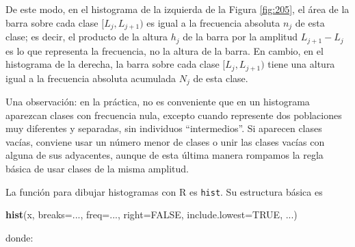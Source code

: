 \documentclass[
]{book}
\newenvironment{Shaded}{\begin{snugshade}}{\end{snugshade}}
\newcommand{\DataTypeTok}[1]{\textcolor[rgb]{0.13,0.29,0.53}{#1}}
\newcommand{\KeywordTok}[1]{\textcolor[rgb]{0.13,0.29,0.53}{\textbf{#1}}}
\newcommand{\NormalTok}[1]{#1}
\newcommand{\OtherTok}[1]{\textcolor[rgb]{0.56,0.35,0.01}{#1}}
\theoremstyle{definition}
\theoremstyle{definition}
\theoremstyle{definition}
\theoremstyle{remark}
\begin{document}
De este modo, en el histograma de la izquierda de la Figura \ref{fig:205}, el área de la barra sobre cada clase \([L_j,L_{j+1})\) es igual a la frecuencia absoluta \(n_j\) de esta clase; es decir, el producto de la altura \(h_j\) de la barra por la amplitud \(L_{j+1}-L_j\) es lo que representa la frecuencia, no la altura de la barra. En cambio, en el histograma de la derecha, la barra sobre cada clase \([L_j,L_{j+1})\) tiene una altura igual a la frecuencia absoluta acumulada \(N_j\) de esta clase.

Una observación: en la práctica, no es conveniente que en un histograma aparezcan clases con frecuencia nula, excepto cuando represente dos poblaciones muy diferentes y separadas, sin individuos ``intermedios''. Si aparecen clases vacías, conviene usar un número menor de clases o unir las clases vacías con alguna de sus adyacentes, aunque de esta última manera rompamos la regla básica de usar clases de la misma amplitud.

La función para dibujar histogramas con R es \texttt{hist}. Su estructura básica es

\begin{Shaded}
\begin{Highlighting}[]
\KeywordTok{hist}\NormalTok{(x, }\DataTypeTok{breaks=}\NormalTok{..., }\DataTypeTok{freq=}\NormalTok{..., }\DataTypeTok{right=}\OtherTok{FALSE}\NormalTok{, }\DataTypeTok{include.lowest=}\OtherTok{TRUE}\NormalTok{, ...)}
\end{Highlighting}
\end{Shaded}

donde:
\end{document}
